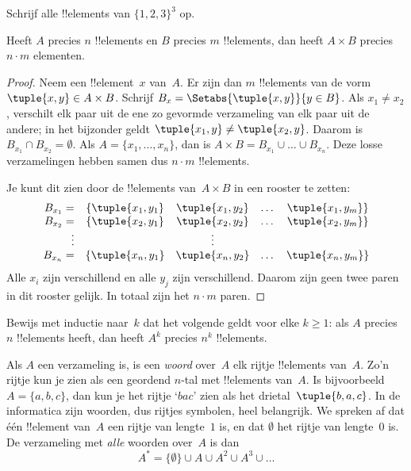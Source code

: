 \documentclass[openany]{memoir}
\begin{document}
\begin{prob}
Schrijf alle !!{element}s van $\{1, 2, 3\}^3$ op.
\end{prob}

\begin{prop}
Heeft $A$ precies $n$ !!{element}s en $B$ precies $m$ !!{element}s,
dan heeft $A \times B$ precies $n\cdot m$ elementen.
\end{prop}

\begin{proof}
Neem een !!{element}~$x$ van~$A$. Er zijn dan $m$ !!{element}s van de
vorm $\tuple{x, y} \in A \times B$. Schrijf $B_x =
\Setabs{\tuple{x, y}}{y \in B}$. Als $x_1 \neq x_2$, verschilt elk
paar uit de ene zo gevormde verzameling van elk paar uit de andere; in het bijzonder geldt
$\tuple{x_1, y} \neq \tuple{x_2, y}$. Daarom is $B_{x_1} \cap B_{x_2}
= \emptyset$. Als $A = \{x_1, \dots, x_n\}$, dan is $A \times B =
B_{x_1} \cup \dots \cup B_{x_n}$. Deze losse verzamelingen hebben
samen dus $n\cdot m$ !!{element}s.

Je kunt dit zien door de !!{element}s van~$A \times B$ in een rooster
te zetten:
\[
\begin{array}{rcccc}
  B_{x_1} = & \{\tuple{x_1, y_1} & \tuple{x_1, y_2} & \dots & \tuple{x_1, y_m}\}\\
  B_{x_2} = & \{\tuple{x_2, y_1} & \tuple{x_2, y_2} & \dots & \tuple{x_2, y_m}\}\\
  \vdots & & \vdots\\
  B_{x_n} = & \{\tuple{x_n, y_1} & \tuple{x_n, y_2} & \dots & \tuple{x_n, y_m}\}
\end{array}
\]
Alle $x_i$ zijn verschillend en alle $y_j$ zijn verschillend. Daarom
zijn geen twee paren in dit rooster gelijk. In totaal zijn het
$n\cdot m$ paren.
\end{proof}

\begin{prob}
Bewijs met inductie naar~$k$ dat het volgende geldt voor elke $k \ge
1$: als $A$ precies $n$ !!{element}s heeft, dan heeft $A^k$ precies
$n^k$ !!{element}s.
\end{prob}

\begin{ex}
Als $A$ een verzameling is, is een \emph{woord} over~$A$ elk rijtje
!!{element}s van~$A$. Zo'n rijtje kun je zien als een geordend $n$-tal met
!!{element}s van~$A$. Is bijvoorbeeld $A = \{a, b, c\}$, dan kun je
het rijtje ‘$bac$’ zien als het drietal~$\tuple{b, a, c}$. In de
informatica zijn woorden, dus rijtjes symbolen, heel belangrijk. We
spreken af dat één !!{element} van~$A$ een rijtje van lengte~$1$ is,
en dat $\emptyset$ het rijtje van lengte~$0$ is. De verzameling met
\emph{alle} woorden over~$A$ is dan
\[
A^* = \{\emptyset\} \cup A \cup A^2 \cup A^3 \cup \dots
\]
\end{ex}
\endgroup
\end{document}
